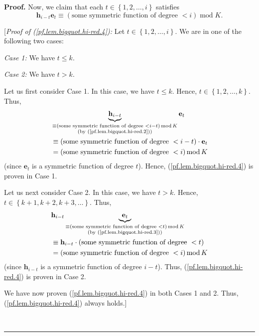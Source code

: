 \documentclass[numbers=enddot,12pt,final,onecolumn,notitlepage]{scrartcl}%
\theoremstyle{definition}
\newenvironment{proof}[1][Proof]{\noindent\textbf{#1.} }{\ \rule{0.5em}{0.5em}}
\begin{document}
\begin{proof}
Now, we claim that each $t\in\left\{  1,2,\ldots,i\right\}  $ satisfies%
\begin{equation}
\mathbf{h}_{i-t}\mathbf{e}_{t}\equiv\left(  \text{some symmetric function of
degree }<i\right)  \operatorname{mod}K. \label{pf.lem.bigquot.hi-red.4}%
\end{equation}


[\textit{Proof of (\ref{pf.lem.bigquot.hi-red.4}):} Let $t\in\left\{
1,2,\ldots,i\right\}  $. We are in one of the following two cases:

\textit{Case 1:} We have $t\leq k$.

\textit{Case 2:} We have $t>k$.

Let us first consider Case 1. In this case, we have $t\leq k$. Hence,
$t\in\left\{  1,2,\ldots,k\right\}  $. Thus,
\begin{align*}
&  \underbrace{\mathbf{h}_{i-t}}_{\substack{\equiv\left(  \text{some symmetric
function of degree }<i-t\right)  \operatorname{mod}K\\\text{(by
(\ref{pf.lem.bigquot.hi-red.2}))}}}\mathbf{e}_{t}\\
&  \equiv\left(  \text{some symmetric function of degree }<i-t\right)
\cdot\mathbf{e}_{t}\\
&  =\left(  \text{some symmetric function of degree }<i\right)
\operatorname{mod}K
\end{align*}
(since $\mathbf{e}_{t}$ is a symmetric function of degree $t$). Hence,
(\ref{pf.lem.bigquot.hi-red.4}) is proven in Case 1.

Let us next consider Case 2. In this case, we have $t>k$. Hence, $t\in\left\{
k+1,k+2,k+3,\ldots\right\}  $. Thus,%
\begin{align*}
&  \mathbf{h}_{i-t}\underbrace{\mathbf{e}_{t}}_{\substack{\equiv\left(
\text{some symmetric function of degree }<t\right)  \operatorname{mod}%
K\\\text{(by (\ref{pf.lem.bigquot.hi-red.3}))}}}\\
&  \equiv\mathbf{h}_{i-t}\cdot\left(  \text{some symmetric function of degree
}<t\right) \\
&  =\left(  \text{some symmetric function of degree }<i\right)
\operatorname{mod}K
\end{align*}
(since $\mathbf{h}_{i-t}$ is a symmetric function of degree $i-t$). Thus,
(\ref{pf.lem.bigquot.hi-red.4}) is proven in Case 2.

We have now proven (\ref{pf.lem.bigquot.hi-red.4}) in both Cases 1 and 2.
Thus, (\ref{pf.lem.bigquot.hi-red.4}) always holds.]


\end{proof}
\end{document}
